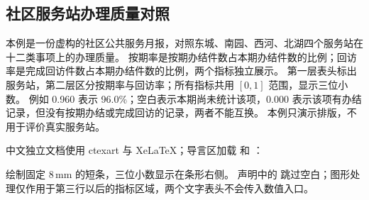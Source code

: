 \subsection{社区服务站办理质量对照}
本例是一份虚构的社区公共服务月报，对照东城、南园、西河、北湖四个服务站在十二类事项上的办理质量。
按期率是按期办结件数占本期办结件数的比例；回访率是完成回访件数占本期办结件数的比例，两个指标独立展示。
第一层表头标出服务站，第二层区分按期率与回访率；所有指标共用 $[0,1]$ 范围，显示三位小数。
例如 0.960 表示 96.0\%；空白表示本期尚未统计该项，0.000 表示该项有办结记录，但没有按期办结或完成回访的记录，两者不能互换。
本例只演示排版，不用于评价真实服务站。

中文独立文档使用 ctexart 与 XeLaTeX；导言区加载  和 ：
\begin{codeonly}
\usepackage{gradbars}
\usepackage{tabularray}
\end{codeonly}
\key{\gradbar} 绘制固定 8\,mm 的短条，三位小数显示在条形右侧。
声明中的  跳过空白；图形处理仅作用于第三行以后的指标区域，两个文字表头不会传入数值入口。

